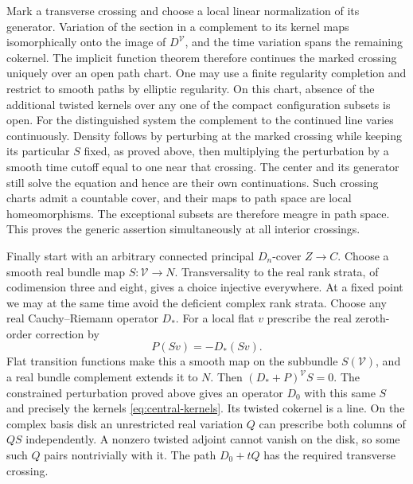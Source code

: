 Mark a transverse crossing and choose a local linear normalization of
its generator. Variation of the section in a complement to its kernel
maps isomorphically onto the image of $D^{\mathcal V}$, and the time
variation spans the remaining cokernel. The implicit function theorem
therefore continues the marked crossing uniquely over an open path
chart. One may use a finite regularity completion and restrict to
smooth paths by elliptic regularity. On this chart, absence of the
additional twisted kernels over any one of the compact configuration
subsets is open. For the distinguished system the complement to the
continued line varies continuously. Density follows by perturbing
at the marked crossing while keeping its particular $S$ fixed, as
proved above, then multiplying the perturbation by a smooth time
cutoff equal to one near that crossing. The center and its generator
still solve the equation and hence are their own continuations.
Such crossing charts admit a countable cover, and their maps to
path space are local homeomorphisms. The exceptional subsets are
therefore meagre in path space. This proves the generic assertion
simultaneously at all interior crossings.

Finally start with an arbitrary connected principal $D_n$-cover
$Z\to C$. Choose a smooth real bundle map $S:\mathcal V\to N$.
Transversality to the real rank strata, of codimension three and
eight, gives a choice injective everywhere. At a fixed point we may
at the same time avoid the deficient complex rank strata. Choose any
real Cauchy--Riemann operator $D_*$. For a local flat $v$ prescribe
the real zeroth-order correction by
\[
                   P(Sv)=-D_*(Sv).
\]
Flat transition functions make this a smooth map on the subbundle
$S(\mathcal V)$, and a real bundle complement extends it to $N$.
Then $(D_*+P)^{\mathcal V}S=0$. The constrained perturbation proved
above gives an operator $D_0$ with this same $S$ and precisely the
kernels \eqref{eq:central-kernels}. Its twisted cokernel is a line.
On the complex basis disk an unrestricted real variation $Q$ can
prescribe both columns of $QS$ independently. A nonzero twisted
adjoint cannot vanish on the disk, so some such $Q$ pairs nontrivially
with it. The path $D_0+tQ$ has the required transverse crossing.
